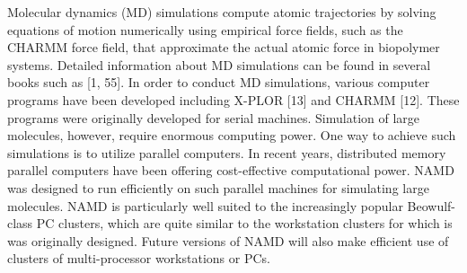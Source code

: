 %
%
%
%
%









%


Molecular dynamics (MD) simulations compute atomic trajectories by solving equations of motion numerically using empirical force fields, such as the CHARMM force field, that approximate the actual atomic force in biopolymer systems. Detailed information about MD simulations can be found in several books such as [1, 55]. In order to conduct MD simulations, various computer programs have been developed including X-PLOR [13] and CHARMM [12]. These programs were originally developed for serial machines. Simulation of large molecules, however, require enormous computing power. One way to achieve such simulations is to utilize parallel computers. In recent years, distributed memory parallel computers have been offering cost-effective computational power. NAMD was designed to run efficiently on such parallel machines for simulating large molecules. NAMD is particularly well suited to the increasingly popular Beowulf-class PC clusters, which are quite similar to the workstation clusters for which is was originally designed. Future versions of NAMD will also make efficient use of clusters of multi-processor workstations or PCs.

